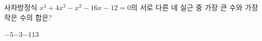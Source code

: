 사차방정식 $x^4+4x^3-x^2-16x-12=0$의 서로 다른 네 실근 중 가장 큰 수와 가장 작은 수의 합은?
\begin{choices32}{$-5$}{$-3$}{$-1$}{$1$}{$3$}\end{choices32}
